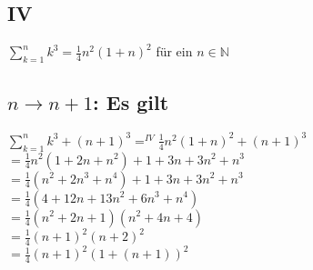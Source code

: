 \documentclass[11pt]{scrartcl}
\begin{document}
\subsection*{IV}
$\sum\limits_{k=1}^n k^3 = \frac{1}{4} n^2 (1+n)^2$ für ein $n \in \mathbb{N}$
\subsection*{$n \rightarrow n+1$: Es gilt}
$\sum\limits_{k=1}^n k^3 +(n+1)^3 =^{IV} \frac{1}{4} n^2 (1+n)^2 + (n+1)^3$ \\
$= \frac{1}{4} n^2 (1+2n +n^2)+1+3n +3n^2 + n^3$\\
$= \frac{1}{4} (n^2 +2n^3 +n^4) + 1 +3n +3n^2 + n^3$\\
$= \frac{1}{4} (4 +12n +13n^2 +6n^3 +n^4)$\\
$= \frac{1}{4} (n^2 +2n +1)(n^2 +4n +4)$\\
$= \frac{1}{4} (n+1)^2 (n+2)^2$\\
$= \frac{1}{4} (n+1)^2 (1+(n+1))^2$\\
\end{document}
